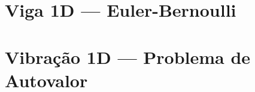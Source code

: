 \section{Viga 1D --- Euler-Bernoulli}
\label{ap:viga1d}



\section{Vibração 1D --- Problema de Autovalor}
\label{ap:vibracao1d}


